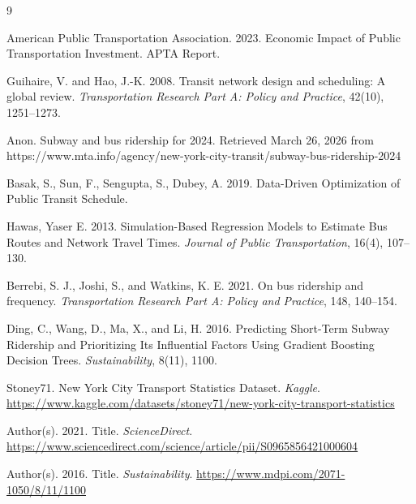 \documentclass[sigconf]{acmart}
\begin{document}

%

\appendix

\begin{thebibliography}{9}

American Public Transportation Association. 2023. Economic Impact of Public Transportation Investment. APTA Report.

Guihaire, V. and Hao, J.-K. 2008. Transit network design and scheduling: A global review. \textit{Transportation Research Part A: Policy and Practice}, 42(10), 1251--1273.

Anon. Subway and bus ridership for 2024. Retrieved March 26, 2026 from https://www.mta.info/agency/new-york-city-transit/subway-bus-ridership-2024 

Basak, S., Sun, F., Sengupta, S., Dubey, A. 2019. Data-Driven Optimization of Public Transit Schedule.

Hawas, Yaser E. 2013. Simulation-Based Regression Models to Estimate Bus Routes and Network Travel Times. \textit{Journal of Public Transportation}, 16(4), 107--130.

Berrebi, S. J., Joshi, S., and Watkins, K. E. 2021. On bus ridership and frequency. \textit{Transportation Research Part A: Policy and Practice}, 148, 140--154.

Ding, C., Wang, D., Ma, X., and Li, H. 2016. Predicting Short-Term Subway Ridership and Prioritizing Its Influential Factors Using Gradient Boosting Decision Trees. \textit{Sustainability}, 8(11), 1100.

Stoney71. New York City Transport Statistics Dataset. \textit{Kaggle}. \url{https://www.kaggle.com/datasets/stoney71/new-york-city-transport-statistics}

Author(s). 2021. Title. \textit{ScienceDirect}. \url{https://www.sciencedirect.com/science/article/pii/S0965856421000604}

Author(s). 2016. Title. \textit{Sustainability}. \url{https://www.mdpi.com/2071-1050/8/11/1100}

\end{thebibliography}
\end{document}
